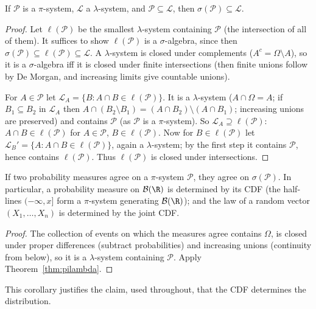 \begin{theorem}\label{thm:pilambda}
If $\mathcal P$ is a $\pi$-system, $\mathcal L$ a $\lambda$-system, and $\mathcal P\subseteq\mathcal L$,
then $\sigma(\mathcal P)\subseteq\mathcal L$.
\end{theorem}
\begin{proof}
Let $\ell(\mathcal P)$ be the smallest $\lambda$-system containing $\mathcal P$
(the intersection of all of them). It suffices to show $\ell(\mathcal P)$ is a
$\sigma$-algebra, since then $\sigma(\mathcal P)\subseteq\ell(\mathcal P)\subseteq\mathcal L$.
A $\lambda$-system is closed under complements ($A^c=\Omega\setminus A$), so it is a
$\sigma$-algebra iff it is closed under finite intersections (then finite unions follow by
De Morgan, and increasing limits give countable unions).

For $A\in\mathcal P$ let $\mathcal L_A=\{B:A\cap B\in\ell(\mathcal P)\}$. It is a $\lambda$-system
($A\cap\Omega=A$; if $B_1\subseteq B_2$ in $\mathcal L_A$ then
$A\cap(B_2\setminus B_1)=(A\cap B_2)\setminus(A\cap B_1)$; increasing unions are preserved) and
contains $\mathcal P$ (as $\mathcal P$ is a $\pi$-system). So $\mathcal L_A\supseteq\ell(\mathcal P)$:
$A\cap B\in\ell(\mathcal P)$ for $A\in\mathcal P$, $B\in\ell(\mathcal P)$. Now for $B\in\ell(\mathcal P)$
let $\mathcal L_B'=\{A:A\cap B\in\ell(\mathcal P)\}$, again a $\lambda$-system; by the first step it
contains $\mathcal P$, hence contains $\ell(\mathcal P)$. Thus $\ell(\mathcal P)$ is closed under
intersections.
\end{proof}

\begin{corollary}\label{cor:unique}
If two probability measures agree on a $\pi$-system $\mathcal P$, they agree on
$\sigma(\mathcal P)$. In particular, a probability measure on $\mathcal B(\R)$ is determined
by its CDF (the half-lines $(-\infty,x]$ form a $\pi$-system generating $\mathcal B(\R)$); and
the law of a random vector $(X_1,\dots,X_n)$ is determined by the joint CDF.
\end{corollary}
\begin{proof}
The collection of events on which the measures agree contains $\Omega$, is closed under
proper differences (subtract probabilities) and increasing unions (continuity from below),
so it is a $\lambda$-system containing $\mathcal P$. Apply Theorem~\ref{thm:pilambda}.
\end{proof}

This corollary justifies the claim, used throughout, that the CDF determines the
distribution.

